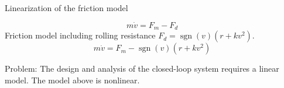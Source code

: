 \documentclass[dvisvgm,hypertex,aspectratio=169]{beamer}
\DeclareMathOperator{\sign}{sgn}
\begin{document}
\begin{frame}[label=L1]{Linearization of the friction model}

  \[ m\dot{v} = F_m - F_d\]
  Friction model including rolling resistance \(F_d = \sign(v)(r + kv^2)\).
  \[ m\dot{v} = F_m -\sign(v)(r + kv^2)\]
  
\begin{center}
  \end{center}
  Problem: The design and analysis of the closed-loop system requires a \alert{linear model}. The model above is \alert{nonlinear}.

\end{frame}
\end{document}

